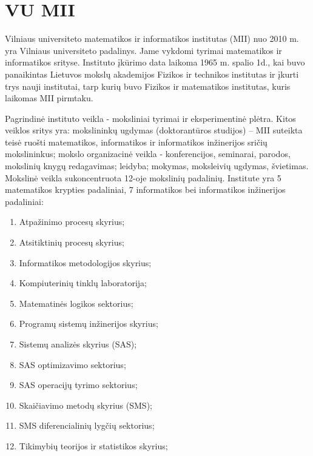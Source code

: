 
\section{VU MII}
\label{imones_apibudinimas}

Vilniaus universiteto matematikos ir informatikos institutas (MII) nuo 2010 m. yra Vilniaus universiteto padalinys. Jame vykdomi tyrimai matematikos ir informatikos srityse. Instituto įkūrimo data laikoma 1965 m. spalio 1d., kai buvo panaikintas Lietuvos mokslų akademijos Fizikos ir technikos institutas ir įkurti trys nauji institutai, tarp kurių buvo Fizikos ir matematikos institutas, kuris laikomas MII pirmtaku. 

Pagrindinė instituto veikla - moksliniai tyrimai ir eksperimentinė plėtra. Kitos veiklos sritys yra: mokslininkų ugdymas (doktorantūros studijos) -- MII suteikta teisė ruošti matematikos, informatikos ir informatikos inžinerijos sričių mokslininkus; mokslo organizacinė veikla - konferencijos, seminarai, parodos, mokslinių knygų redagavimas; leidyba; mokymas, moksleivių ugdymas, švietimas. Mokslinė veikla sukoncentruota 12-oje mokslinių padalinių. Institute yra 5 matematikos krypties padaliniai, 7 informatikos bei informatikos inžinerijos padaliniai:
\begin{enumerate}
  \item Atpažinimo procesų skyrius;
  \item Atsitiktinių procesų skyrius;
  \item Informatikos metodologijos skyrius;
  \item Kompiuterinių tinklų laboratorija;
  \item Matematinės logikos sektorius;
  \item Programų sistemų inžinerijos skyrius;
  \item Sistemų analizės skyrius (SAS);
  \item SAS optimizavimo sektorius;
  \item SAS operacijų tyrimo sektorius;
  \item Skaičiavimo metodų skyrius (SMS);
  \item SMS diferencialinių lygčių sektorius;
  \item Tikimybių teorijos ir statistikos skyrius;
\end{enumerate}

